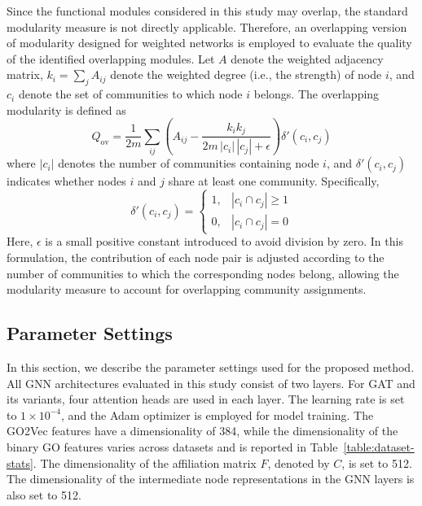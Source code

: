 Since the functional modules considered in this study may overlap, the standard modularity measure is not directly applicable. Therefore, an overlapping version of modularity designed for weighted networks is employed to evaluate the quality of the identified overlapping modules. Let $A$ denote the weighted adjacency matrix, $k_i=\sum_j A_{ij}$ denote the weighted degree (i.e., the strength) of node $i$, and $c_i$ denote the set of communities to which node $i$ belongs. The overlapping modularity is defined as
\begin{equation}
	\label{eq:modularity-overlapping}
	Q_{\mathrm{ov}}
	=
	\frac{1}{2m}
	\sum_{ij}
	\left(
	A_{ij}
	-
	\frac{k_i k_j}{2m\,|c_i|\,|c_j|+\epsilon}
	\right)
	\delta'(c_i,c_j)
\end{equation}
where $|c_i|$ denotes the number of communities containing node $i$, and
$\delta'(c_i,c_j)$ indicates whether nodes $i$ and $j$ share at least one community. Specifically,
\begin{equation}
	\delta'(c_i,c_j)
	=
	\begin{cases}
		1, & |c_i \cap c_j| \geq 1\\
		0, & |c_i \cap c_j| = 0
	\end{cases}
\end{equation}
Here, $\epsilon$ is a small positive constant introduced to avoid division by zero. In this formulation, the contribution of each node pair is adjusted according to the number of communities to which the corresponding nodes belong, allowing the modularity measure to account for overlapping community assignments.

\subsection{Parameter Settings}

In this section, we describe the parameter settings used for the proposed method. All GNN architectures evaluated in this study consist of two layers. For GAT and its variants, four attention heads are used in each layer. The learning rate is set to $1\times10^{-4}$, and the Adam optimizer is employed for model training. The GO2Vec features have a dimensionality of 384, while the dimensionality of the binary GO features varies across datasets and is reported in Table~\ref{table:dataset-stats}. The dimensionality of the affiliation matrix $F$, denoted by $C$, is set to 512. The dimensionality of the intermediate node representations in the GNN layers is also set to 512.

